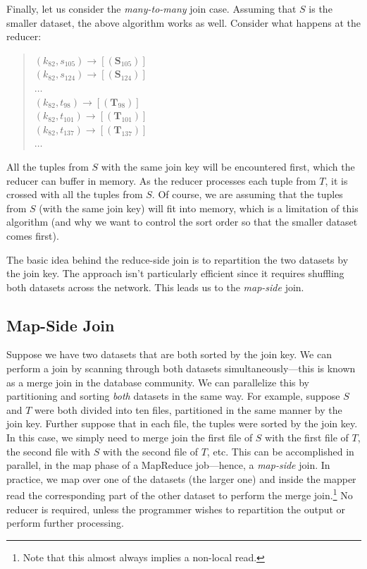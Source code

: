 Finally, let us consider the {\it many-to-many} join case.  Assuming
that $S$ is the smaller dataset, the above algorithm works as well.
Consider what happens at the reducer:

\begin{quote}
$(k_{82}, s_{105}) \rightarrow [(\textbf{S}_{105})]$ \\
$(k_{82}, s_{124}) \rightarrow [(\textbf{S}_{124})]$ \\
$\ldots$ \\
$(k_{82}, t_{98})  \rightarrow [(\textbf{T}_{98})]$ \\
$(k_{82}, t_{101}) \rightarrow [(\textbf{T}_{101})]$ \\
$(k_{82}, t_{137}) \rightarrow [(\textbf{T}_{137})]$ \\
$\ldots$
\end{quote}

\noindent All the tuples from $S$ with the same join key will be
encountered first, which the reducer can buffer in memory.  As the
reducer processes each tuple from $T$, it is crossed with all the
tuples from $S$.  Of course, we are assuming that the tuples from $S$
(with the same join key) will fit into memory, which is a limitation
of this algorithm (and why we want to control the sort order so that
the smaller dataset comes first).

The basic idea behind the reduce-side join is to repartition the two
datasets by the join key.  The approach isn't particularly efficient
since it requires shuffling both datasets across the network.  This
leads us to the {\it map-side} join.

\subsection{Map-Side Join}

Suppose we have two datasets that are both sorted by the join key.  We
can perform a join by scanning through both datasets
simultaneously---this is known as a merge join in the database
community.  We can parallelize this by partitioning and sorting {\it
  both} datasets in the same way.  For example, suppose $S$ and $T$
were both divided into ten files, partitioned in the same manner by
the join key.  Further suppose that in each file, the tuples were
sorted by the join key.  In this case, we simply need to merge join
the first file of $S$ with the first file of $T$, the second file with
$S$ with the second file of $T$, etc.  This can be accomplished in
parallel, in the map phase of a MapReduce job---hence, a {\it
  map-side} join.  In practice, we map over one of the datasets (the
larger one) and inside the mapper read the corresponding part of the
other dataset to perform the merge join.\footnote{Note that this
  almost always implies a non-local read.}  No reducer is required,
unless the programmer wishes to repartition the output or perform
further processing.

